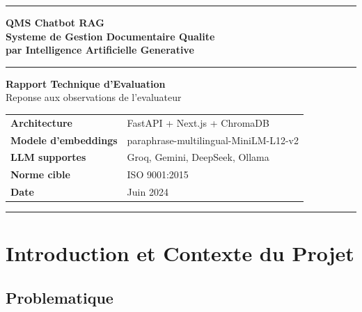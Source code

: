 \documentclass[12pt,a4paper]{article}
\begin{document}
\begin{titlepage}
  \centering
  \vspace*{2cm}

  {\color{primary}\rule{\linewidth}{2pt}}
  \vspace{1cm}

  {\Huge\bfseries\color{primary}
    QMS Chatbot RAG\\[0.4em]
    \Large\color{secondary}
    Systeme de Gestion Documentaire Qualite\\
    par Intelligence Artificielle Generative
  }

  \vspace{1cm}
  {\color{primary}\rule{\linewidth}{2pt}}

  \vspace{1.5cm}

  {\large\bfseries Rapport Technique d'Evaluation}\\[0.5em]
  {\normalsize Reponse aux observations de l'evaluateur}

  \vfill

  \begin{tabular}{ll}
    \textbf{Architecture} & FastAPI + Next.js + ChromaDB \\
    \textbf{Modele d'embeddings} & paraphrase-multilingual-MiniLM-L12-v2 \\
    \textbf{LLM supportes} & Groq, Gemini, DeepSeek, Ollama \\
    \textbf{Norme cible} & ISO 9001:2015 \\
    \textbf{Date} & Juin 2024 \\
  \end{tabular}

  \vspace{2cm}

  {\color{primary}\rule{\linewidth}{1pt}}
\end{titlepage}

\tableofcontents
\newpage

\section{Introduction et Contexte du Projet}

\subsection{Problematique}
\end{document}
